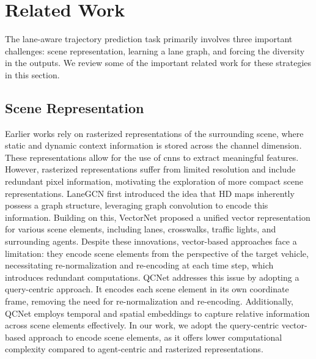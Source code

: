 \section{Related Work}\label{section:related_work}
The lane-aware trajectory prediction task primarily involves three important challenges: scene representation, learning a lane graph, and forcing the diversity in the outputs. We review some of the important related work for these strategies in this section.

\subsection{Scene Representation}\label{subsection:scene_rep}
Earlier works \cite{cui2019multimodal,chai2019multipath} rely on rasterized representations of the surrounding scene, where static and dynamic context information is stored across the channel dimension. These representations allow for the use of \acp{cnn} to extract meaningful features. However, rasterized representations suffer from limited resolution and include redundant pixel information, motivating the exploration of more compact scene representations. LaneGCN \cite{liang2020learning} first introduced the idea that HD maps inherently possess a graph structure, leveraging graph convolution to encode this information. Building on this, VectorNet \cite{gao2020vectornet} proposed a unified vector representation for various scene elements, including lanes, crosswalks, traffic lights, and surrounding agents. Despite these innovations, vector-based approaches face a limitation: they encode scene elements from the perspective of the target vehicle, necessitating re-normalization and re-encoding at each time step, which introduces redundant computations. QCNet \cite{zhou2023query} addresses this issue by adopting a query-centric approach. It encodes each scene element in its own coordinate frame, removing the need for re-normalization and re-encoding. Additionally, QCNet employs temporal and spatial embeddings to capture relative information across scene elements effectively. In our work, we adopt the query-centric vector-based approach to encode scene elements, as it offers lower computational complexity compared to agent-centric and rasterized representations.

